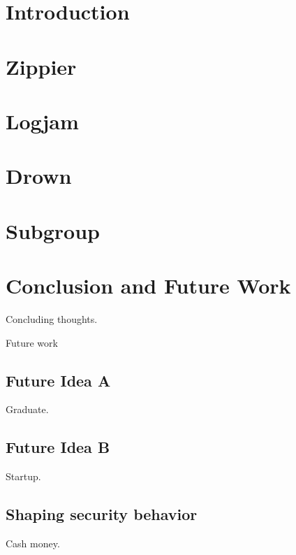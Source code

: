 



\chapter{Introduction}


\chapter{Zippier}

\chapter{Logjam}

\chapter{Drown}

\chapter{Subgroup}


\chapter{Conclusion and Future Work}

Concluding thoughts.

Future work

\section{Future Idea A}
Graduate.

\section{Future Idea B}
Startup.

\section{Shaping security behavior}
Cash money.





